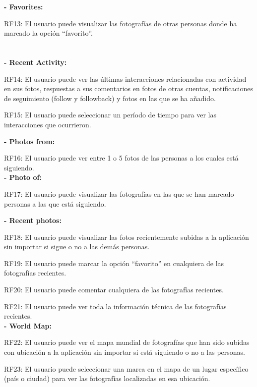 \documentclass{memoria}
\begin{document}
\textbf{- Favorites:}

RF13: El usuario puede visualizar las fotografías de otras personas donde ha marcado la opción “favorito”.\\\\\\

\textbf{- Recent Activity:}

RF14: El usuario puede ver las últimas interacciones relacionadas con actividad en sus fotos, respuestas a sus comentarios en fotos de otras cuentas, notificaciones de seguimiento (follow y followback) y fotos en las que se ha añadido.

RF15: El usuario puede seleccionar un período de tiempo para ver las interacciones que ocurrieron.\\


\textbf{- Photos from:} 

RF16: El usuario puede  ver entre 1 o 5 fotos de las personas a los cuales está siguiendo.\\

\textbf{- Photo of:} 

RF17: El usuario puede visualizar las fotografías en las que se han marcado personas a las que está siguiendo.\\


\textbf{- Recent photos:}

RF18: El usuario puede visualizar las fotos recientemente subidas a la aplicación sin importar si sigue o no a las demás personas.

RF19: El usuario puede marcar la opción “favorito” en cualquiera de las fotografías recientes.

RF20: El usuario puede comentar cualquiera de las fotografías recientes.

RF21: El usuario puede ver toda la información técnica de las fotografías recientes.\\

\textbf{- World Map:}

RF22: El usuario puede ver el mapa mundial de fotografías que han sido subidas con ubicación a la aplicación sin importar si está siguiendo o no a las personas.

RF23: El usuario puede seleccionar una marca en el mapa de un lugar específico (país o ciudad) para ver las fotografías localizadas en esa ubicación.
\end{document}
